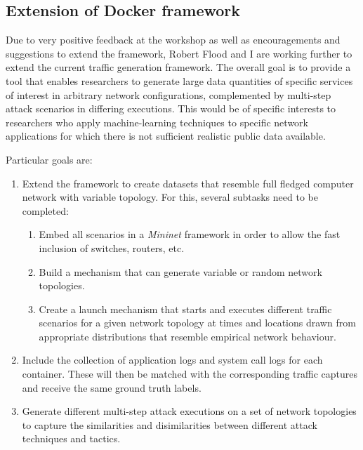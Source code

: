 \documentclass[a4paper,12pt,twoside]{article}
\begin{document}
\subsection{Extension of Docker framework}\label{Sec:dockerext}

Due to very positive feedback at the workshop as well as encouragements and suggestions to extend the framework, Robert Flood and I are working further to extend the current traffic generation framework. The overall goal is to provide a tool that enables researchers to generate large data quantities of specific services of interest in arbitrary network configurations, complemented by multi-step attack scenarios in differing executions. This would be of specific interests to researchers who apply machine-learning techniques to specific network applications for which there is not sufficient realistic public data available.

Particular goals are:

\begin{enumerate}
\item Extend the framework to create datasets that resemble full fledged computer network with variable topology. For this, several subtasks need to be completed:

\begin{enumerate}

\item Embed all scenarios in a \textit{Mininet} framework in order to allow the fast inclusion of switches, routers, etc.

\item Build a mechanism that can generate variable or random network topologies.

\item Create a launch mechanism that starts and executes different traffic scenarios for a given network topology at times and locations drawn from appropriate distributions that resemble empirical network behaviour.

\end{enumerate}
\item Include the collection of application logs and system call logs for each container. These will then be matched with the corresponding traffic captures and receive the same ground truth labels.

\item Generate different multi-step attack executions on a set of network topologies to capture the similarities and disimilarities between different attack techniques and tactics.

\end{enumerate}
\end{document}
